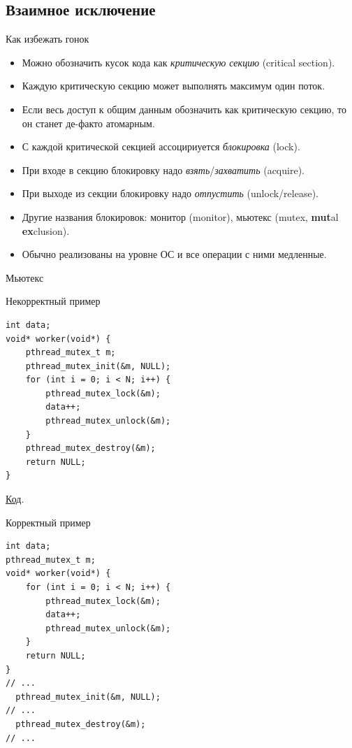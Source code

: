 \subsection{Взаимное исключение}

\begin{frame}
\end{frame}

\begin{frame}{Как избежать гонок}
	\begin{itemize}
		\item Можно обозначить кусок кода как \textit{критическую секцию} (critical section).
		\item Каждую критическую секцию может выполнять максимум один поток.
		\item
			Если весь доступ к общим данным обозначить как критическую секцию,
			то он станет де-факто атомарным.
		\item С каждой критической секцией ассоцириуется \textit{блокировка} (lock).
		\item При входе в секцию блокировку надо \textit{взять}/\textit{захватить} (acquire).
		\item При выходе из секции блокировку надо \textit{отпустить} (unlock/release).
		\item Другие названия блокировок: монитор (monitor), мьютекс (mutex, \textbf{mut}al \textbf{ex}clusion).
		\item Обычно реализованы на уровне ОС и все операции с ними медленные.
	\end{itemize}
\end{frame}

\begin{frame}{Мьютекс}
\end{frame}

\begin{frame}[fragile]{Некорректный пример}
\begin{verbatim}
int data;
void* worker(void*) {
    pthread_mutex_t m;
    pthread_mutex_init(&m, NULL);
    for (int i = 0; i < N; i++) {
        pthread_mutex_lock(&m);
        data++;
        pthread_mutex_unlock(&m);
    }
    pthread_mutex_destroy(&m);
    return NULL;
}
\end{verbatim}
\href{https://raw.githubusercontent.com/yeputons/spring-2019-paradigms/master/190410/sources/09-two-threads-bad-mutex.cpp}{Код}.
\end{frame}

\begin{frame}[fragile]{Корректный пример}
\begin{verbatim}
int data;
pthread_mutex_t m;
void* worker(void*) {
    for (int i = 0; i < N; i++) {
        pthread_mutex_lock(&m);
        data++;
        pthread_mutex_unlock(&m);
    }
    return NULL;
}
// ...
  pthread_mutex_init(&m, NULL);
// ...
  pthread_mutex_destroy(&m);
// ...
\end{verbatim}
\end{frame}

